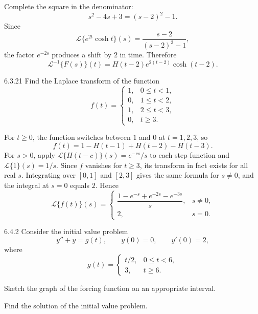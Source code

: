 \documentclass[11pt,oneside]{article}
\begin{document}
\begin{solution}
Complete the square in the denominator:
\[
    s^2-4s+3=(s-2)^2-1.
\]
Since
\[
    \mathcal{L}\{e^{2t}\cosh t\}(s)
    =\frac{s-2}{(s-2)^2-1},
\]
the factor $e^{-2s}$ produces a shift by $2$ in time. Therefore
\[
    \boxed{
        \mathcal{L}^{-1}\{F(s)\}(t)
        =H(t-2)e^{2(t-2)}\cosh(t-2)
    }.
\]
\end{solution}

\begin{problem}{6.3.21}
Find the Laplace transform of the function
\[
    f(t)=
    \begin{cases}
        1, & 0\leq t<1,\\
        0, & 1\leq t<2,\\
        1, & 2\leq t<3,\\
        0, & t\geq3.
    \end{cases}
\]
\end{problem}

\begin{solution}
For $t\geq0$, the function switches between $1$ and $0$ at $t=1, 2, 3$, so
\[
    f(t)=1-H(t-1)+H(t-2)-H(t-3).
\]
For $s>0$, apply $\mathcal{L}\{H(t-c)\}(s)=e^{-cs}/s$ to each step function and $\mathcal{L}\{1\}(s)=1/s$. Since $f$ vanishes for $t\geq3$, its transform in fact exists for all real $s$. Integrating over $[0, 1]$ and $[2, 3]$ gives the same formula for $s\ne0$, and the integral at $s=0$ equals $2$. Hence
\[
    \boxed{\mathcal{L}\{f(t)\}(s)=
    \begin{cases}
        \dfrac{1-e^{-s}+e^{-2s}-e^{-3s}}{s}, & s\ne0,\\[0.5em]
        2, & s=0.
    \end{cases}}
\]
\end{solution}

\begin{problem}{6.4.2}
Consider the initial value problem
\[
    y''+y=g(t), \qquad y(0)=0, \qquad y'(0)=2,
\]
where
\[
    g(t)=
    \begin{cases}
       t/2, & 0\leq t<6,\\
       3, & t\geq6.
    \end{cases}
\]
\begin{problemsubparts}
    \item Sketch the graph of the forcing function on an appropriate interval.
    \item Find the solution of the initial value problem.
\end{problemsubparts}
\end{problem}
\end{document}
